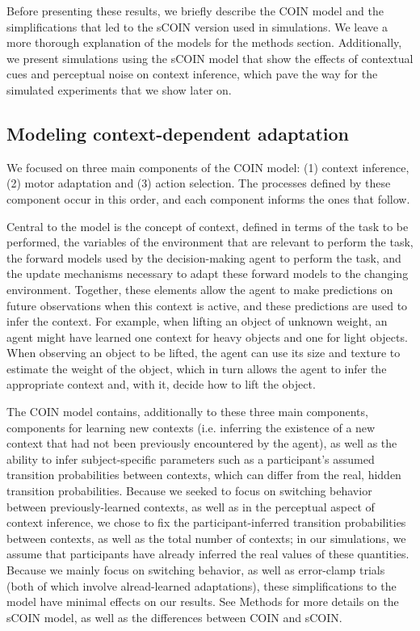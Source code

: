 \documentclass[a4paper,doc,floatsintext,natbib]{apa6}
\begin{document}
Before presenting these results, we briefly describe the COIN model and the simplifications that led to the sCOIN version used in simulations. We leave a more thorough explanation of the models for the methods section. Additionally, we present simulations using the sCOIN model that show the effects of contextual cues and perceptual noise on context inference, which pave the way for the simulated experiments that we show later on.


\subsection{Modeling context-dependent adaptation}
We focused on three main components of the COIN model: (1) context inference, (2) motor adaptation and (3) action selection. The processes defined by these component occur in this order, and each component informs the ones that follow.

Central to the model is the concept of context, defined in terms of the task to be performed, the variables of the environment that are relevant to perform the task, the forward models used by the decision-making agent to perform the task, and the update mechanisms necessary to adapt these forward models to the changing environment. Together, these elements allow the agent to make predictions on future observations when this context is active, and these predictions are used to infer the context. For example, when lifting an object of unknown weight, an agent might have learned one context for heavy objects and one for light objects. When observing an object to be lifted, the agent can use its size and texture to estimate the weight of the object, which in turn allows the agent to infer the appropriate context and, with it, decide how to lift the object.

The COIN model contains, additionally to these three main components, components for learning new contexts (i.e. inferring the existence of a new context that had not been previously encountered by the agent), as well as the ability to infer subject-specific parameters such as a participant's assumed transition probabilities between contexts, which can differ from the real, hidden transition probabilities. Because we seeked to focus on switching behavior between previously-learned contexts, as well as in the perceptual aspect of context inference, we chose to fix the participant-inferred transition probabilities between contexts, as well as the total number of contexts; in our simulations, we assume that participants have already inferred the real values of these quantities. Because we mainly focus on switching behavior, as well as error-clamp trials (both of which involve alread-learned adaptations), these simplifications to the model have minimal effects on our results. See Methods for more details on the sCOIN model, as well as the differences between COIN and sCOIN.
\end{document}

